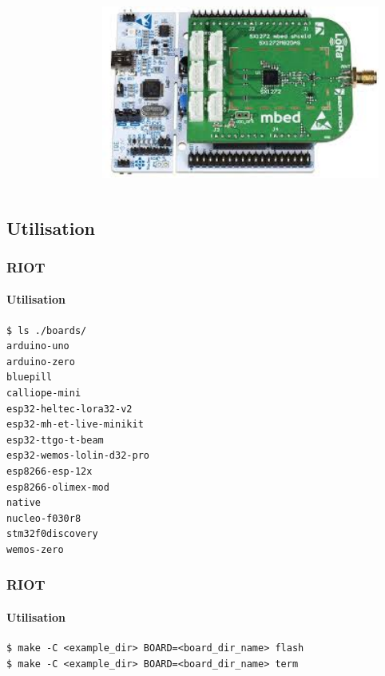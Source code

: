 \begin{frame}
\begin{columns}
\begin{column}{0.35\textwidth}
  \end{column}
  \begin{column}{0.3\textwidth}
  \includegraphics[width=0.9\textwidth]{presentation.tex/fig/loramote3.jpg}
  \end{column}
\end{columns}
  
\end{frame}

\subsection{Utilisation}

\begin{frame}[fragile]
\frametitle{RIOT}
\framesubtitle{Utilisation}
  
\begin{verbatim}
$ ls ./boards/
arduino-uno
arduino-zero
bluepill
calliope-mini
esp32-heltec-lora32-v2
esp32-mh-et-live-minikit
esp32-ttgo-t-beam
esp32-wemos-lolin-d32-pro
esp8266-esp-12x
esp8266-olimex-mod
native
nucleo-f030r8
stm32f0discovery
wemos-zero
\end{verbatim}

\end{frame}

\begin{frame}[fragile]
\frametitle{RIOT}
\framesubtitle{Utilisation}

\begin{verbatim}
$ make -C <example_dir> BOARD=<board_dir_name> flash
$ make -C <example_dir> BOARD=<board_dir_name> term
\end{verbatim}
  
\end{frame}


